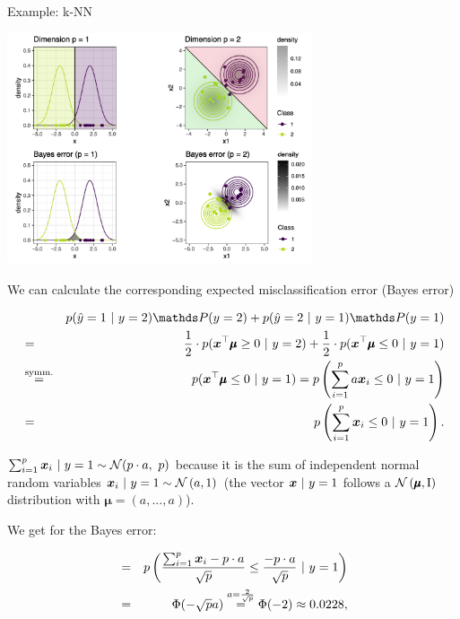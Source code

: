 \begin{vbframe}{Example: k-NN}
\begin{center}
\includegraphics[width = 9cm]{figure_man/knn_error.png}
\end{center}


\framebreak 

We can calculate the corresponding expected misclassification error (Bayes error)

\begin{footnotesize}
\begin{eqnarray*}
&&  p(\hat y = 1 ~|~y = 2)\P(y = 2) + p(\hat y = 2 ~|~y = 1)\P(y = 1)\\
&=& \frac{1}{2} \cdot p(\xv^\top \pmb\mu \ge 0 ~|~ y = 2) + \frac{1}{2} \cdot p(\xv^\top \pmb\mu \le 0 ~|~ y = 1) \\
&\overset{\text{symm.}}{=}& p(\xv^\top \pmb\mu \le 0 ~|~ y = 1) = p\left(\sum_{i = 1}^p a \xv_i \le 0 ~|~ y = 1\right)\\
  &=& p\left(\sum_{i = 1}^p \xv_i \le 0 ~|~ y = 1\right). 
\end{eqnarray*}
\end{footnotesize}

$\sum_{i = 1}^p \bm{x}_i ~|~ y = 1\sim \mathcal{N}(p \cdot a,~ p)$ because it is the sum of independent normal random variables $\bm{x}_i ~|~ y = 1 \sim \mathcal{N}\left(a, 1\right)$ (the vector $\bm{x} ~|~ y = 1$ follows a $\mathcal{N}\left(\pmb\mu, \mathrm{I}\right)$ distribution with $\pmb\mu = \left(a, ..., a\right)$). 

\framebreak 

We get for the Bayes error: 

\begin{eqnarray*}
 &=& p\left(\frac{\sum_{i = 1}^p \bm{x}_i - p \cdot a}{\sqrt{p}} \le \frac{- p\cdot a}{\sqrt{p}} ~|~ y = 1\right) \\ &=& \Phi(- \sqrt{p} a) \overset{a = \frac{2}{\sqrt{p}}}{=} \Phi(- 2) \approx 0.0228,
\end{eqnarray*}


\end{vbframe}
